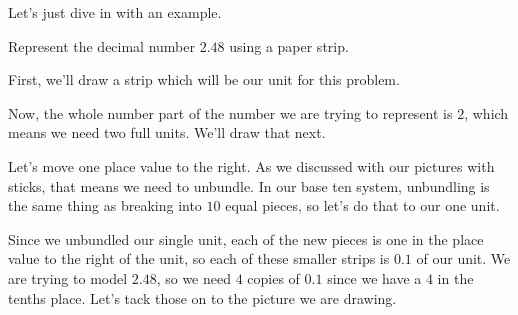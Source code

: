 \documentclass{ximera}
\begin{document}
Let's just dive in with an example.

\begin{example}
Represent the decimal number $2.48$ using a paper strip.


First, we'll draw a strip which will be our unit for this problem.

\begin{image}
\end{image}

Now, the whole number part of the number we are trying to represent is $2$, which means we need two full units. We'll draw that next.

\begin{image}
\end{image}

Let's move one place value to the right. As we discussed with our pictures with sticks, that means we need to unbundle. In our base ten system, unbundling is the same thing as breaking into $10$ equal pieces, so let's do that to our one unit.

\begin{image}
\end{image}

Since we unbundled our single unit, each of the new pieces is one in the place value to the right of the unit, so each of these smaller strips is $0.1$ of our unit. We are trying to model $2.48$, so we need $4$ copies of $0.1$ since we have a $4$ in the tenths place. Let's tack those on to the picture we are drawing.

\begin{image}
\end{image}


\end{example}
\end{document}
